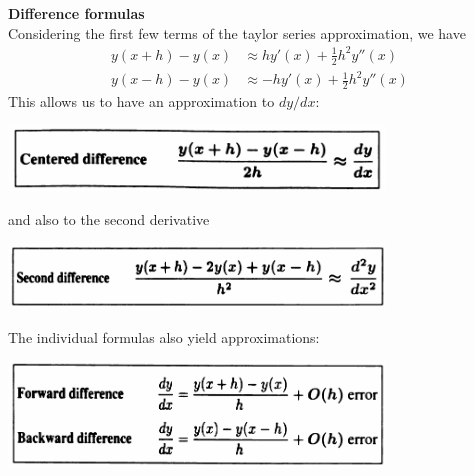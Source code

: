 \documentclass{report}
\begin{document}
\textbf{Difference formulas}\\
Considering the first few terms of the taylor series approximation, we have
\begin{align*}
y(x+h)-y(x)&\approx hy'(x)+\frac{1}{2}h^2y''(x)\\
y(x-h)-y(x)&\approx-hy'(x)+\frac{1}{2}h^2y''(x)
\end{align*}
This allows us to have an approximation to $dy/dx$:
\begin{center}
\includegraphics[width=10cm]{22}
\end{center}
and also to the second derivative
\begin{center}
\includegraphics[width=10cm]{23}
\end{center}
The individual formulas also yield approximations:
\begin{center}
\includegraphics[width=10cm]{24}
\end{center}
\end{document}
